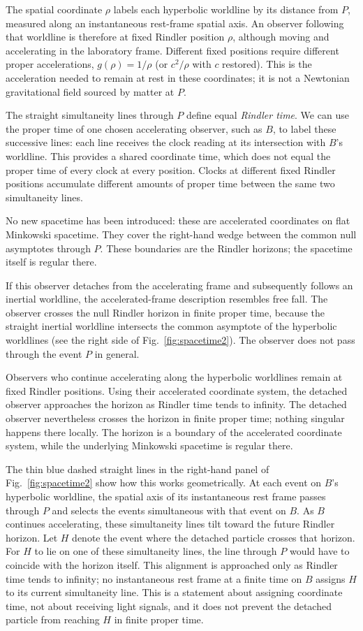 \documentclass[12pt]{article}
\begin{document}
The spatial coordinate $\rho$ labels each hyperbolic worldline by its distance from $P$, measured along an instantaneous rest-frame spatial axis. An observer following that worldline is therefore at fixed Rindler position $\rho$, although moving and accelerating in the laboratory frame. Different fixed positions require different proper accelerations, $g(\rho)=1/\rho$ (or $c^2/\rho$ with $c$ restored). This is the acceleration needed to remain at rest in these coordinates; it is not a Newtonian gravitational field sourced by matter at $P$.

The straight simultaneity lines through $P$ define equal \emph{Rindler time}. We can use the proper time of one chosen accelerating observer, such as $B$, to label these successive lines: each line receives the clock reading at its intersection with $B$'s worldline. This provides a shared coordinate time, which does not equal the proper time of every clock at every position. Clocks at different fixed Rindler positions accumulate different amounts of proper time between the same two simultaneity lines.

No new spacetime has been introduced: these are accelerated coordinates on flat Minkowski spacetime. They cover the right-hand wedge between the common null asymptotes through $P$. These boundaries are the Rindler horizons; the spacetime itself is regular there.

If this observer detaches from the accelerating frame and subsequently follows an inertial worldline, the accelerated-frame description resembles free fall. The observer crosses the null Rindler horizon in finite proper time, because the straight inertial worldline intersects the common asymptote of the hyperbolic worldlines (see the right side of Fig.~\ref{fig:spacetime2}). The observer does not pass through the event $P$ in general.

Observers who continue accelerating along the hyperbolic worldlines remain at fixed Rindler positions. Using their accelerated coordinate system, the detached observer approaches the horizon as Rindler time tends to infinity. The detached observer nevertheless crosses the horizon in finite proper time; nothing singular happens there locally. The horizon is a boundary of the accelerated coordinate system, while the underlying Minkowski spacetime is regular there.

The thin blue dashed straight lines in the right-hand panel of Fig.~\ref{fig:spacetime2} show how this works geometrically. At each event on $B$'s hyperbolic worldline, the spatial axis of its instantaneous rest frame passes through $P$ and selects the events simultaneous with that event on $B$. As $B$ continues accelerating, these simultaneity lines tilt toward the future Rindler horizon. Let $H$ denote the event where the detached particle crosses that horizon. For $H$ to lie on one of these simultaneity lines, the line through $P$ would have to coincide with the horizon itself. This alignment is approached only as Rindler time tends to infinity; no instantaneous rest frame at a finite time on $B$ assigns $H$ to its current simultaneity line. This is a statement about assigning coordinate time, not about receiving light signals, and it does not prevent the detached particle from reaching $H$ in finite proper time.
\end{document}
